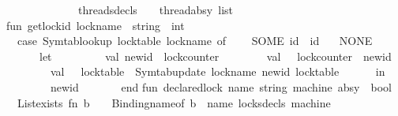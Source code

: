 \begin{isabellebody}
\ \ \ \ \ \ \ \ \ \ \ \ \ threads{\isacharunderscore}{\kern0pt}decls\ \ \ {\isacharcolon}{\kern0pt}\ thread{\isacharunderscore}{\kern0pt}absy\ list\isanewline
\ \ \ \ \ \ \ \ \ \ \ \ {\isacharbraceright}{\kern0pt}\isanewline
\isanewline
fun\ get{\isacharunderscore}{\kern0pt}lock{\isacharunderscore}{\kern0pt}id\ {\isacharparenleft}{\kern0pt}lock{\isacharunderscore}{\kern0pt}name\ {\isacharcolon}{\kern0pt}\ string{\isacharparenright}{\kern0pt}\ {\isacharcolon}{\kern0pt}\ int\ {\isacharequal}{\kern0pt}\isanewline
\ \ case\ Symtab{\isachardot}{\kern0pt}lookup\ {\isacharparenleft}{\kern0pt}{\isacharbang}{\kern0pt}lock{\isacharunderscore}{\kern0pt}table{\isacharparenright}{\kern0pt}\ lock{\isacharunderscore}{\kern0pt}name\ of\isanewline
\ \ \ \ SOME\ id\ {\isacharequal}{\kern0pt}{\isachargreater}{\kern0pt}\ id\isanewline
\ \ {\isacharbar}{\kern0pt}\ NONE\ {\isacharequal}{\kern0pt}{\isachargreater}{\kern0pt}\ \isanewline
\ \ \ \ \ \ let\ \isanewline
\ \ \ \ \ \ \ \ val\ new{\isacharunderscore}{\kern0pt}id\ {\isacharequal}{\kern0pt}\ {\isacharbang}{\kern0pt}lock{\isacharunderscore}{\kern0pt}counter\isanewline
\ \ \ \ \ \ \ \ val\ {\isacharunderscore}{\kern0pt}\ {\isacharequal}{\kern0pt}\ lock{\isacharunderscore}{\kern0pt}counter\ {\isacharcolon}{\kern0pt}{\isacharequal}{\kern0pt}\ new{\isacharunderscore}{\kern0pt}id\ {\isacharplus}{\kern0pt}\ {}\isanewline
\ \ \ \ \ \ \ \ val\ {\isacharunderscore}{\kern0pt}\ {\isacharequal}{\kern0pt}\ lock{\isacharunderscore}{\kern0pt}table\ {\isacharcolon}{\kern0pt}{\isacharequal}{\kern0pt}\ Symtab{\isachardot}{\kern0pt}update\ {\isacharparenleft}{\kern0pt}lock{\isacharunderscore}{\kern0pt}name{\isacharcomma}{\kern0pt}\ new{\isacharunderscore}{\kern0pt}id{\isacharparenright}{\kern0pt}\ {\isacharparenleft}{\kern0pt}{\isacharbang}{\kern0pt}lock{\isacharunderscore}{\kern0pt}table{\isacharparenright}{\kern0pt}\isanewline
\ \ \ \ \ \ in\ \isanewline
\ \ \ \ \ \ \ \ new{\isacharunderscore}{\kern0pt}id\ \isanewline
\ \ \ \ \ \ end\isanewline
{\isacharasterisk}{\kern0pt}{\isacharparenright}{\kern0pt}\isanewline
\isanewline
fun\ declared{\isacharunderscore}{\kern0pt}lock\ {\isacharparenleft}{\kern0pt}name{\isacharcolon}{\kern0pt}\ string{\isacharparenright}{\kern0pt}\ {\isacharparenleft}{\kern0pt}machine{\isacharcolon}{\kern0pt}\ absy{\isacharparenright}{\kern0pt}\ {\isacharcolon}{\kern0pt}\ bool\ {\isacharequal}{\kern0pt}\isanewline
\ \ List{\isachardot}{\kern0pt}exists\ {\isacharparenleft}{\kern0pt}fn\ {\isacharparenleft}{\kern0pt}b{\isacharcomma}{\kern0pt}\ {\isacharunderscore}{\kern0pt}{\isacharcomma}{\kern0pt}\ {\isacharunderscore}{\kern0pt}{\isacharparenright}{\kern0pt}\ {\isacharequal}{\kern0pt}{\isachargreater}{\kern0pt}\ Binding{\isachardot}{\kern0pt}name{\isacharunderscore}{\kern0pt}of\ b\ {\isacharequal}{\kern0pt}\ name{\isacharparenright}{\kern0pt}\ {\isacharparenleft}{\kern0pt}{\isacharhash}{\kern0pt}locks{\isacharunderscore}{\kern0pt}decls\ machine{\isacharparenright}{\kern0pt}\isanewline

\end{isabellebody}
